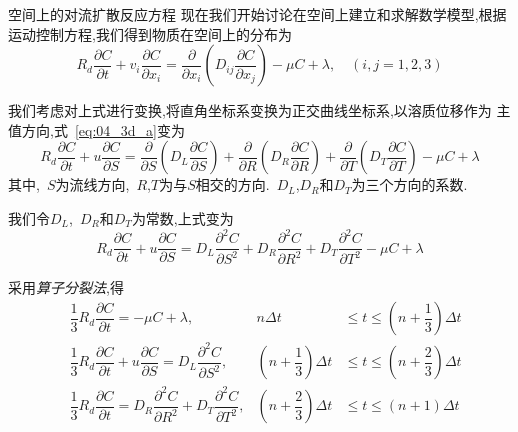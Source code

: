 \documentclass[xcolor=svgnames]{beamer} %
\begin{document}
\begin{frame}{空间上的对流扩散反应方程}
 现在我们开始讨论在空间上建立和求解数学模型,根据运动控制方程,我们得到物质在空间上的分布为
\begin{equation}\label{eq:04_3d_a}
R_d\dfrac{\partial C}{\partial t}+v_i\dfrac{\partial C}{\partial x_i}=\dfrac{\partial}{\partial x_i}(D_{ij}\dfrac{\partial C}
{\partial x_j})-\mu C+\lambda,\quad (i,j=1,2,3)
\end{equation}\par
\end{frame}
\begin{frame}
我们考虑对上式进行变换,将直角坐标系变换为正交曲线坐标系,以溶质位移作为
主值方向,式~\eqref{eq:04_3d_a}变为
\begin{equation}
R_d\dfrac{\partial C}{\partial t}+u\dfrac{\partial C}
{\partial S}=\dfrac{\partial}{\partial S}(D_L\dfrac{\partial C}{\partial S})
+\dfrac{\partial}{\partial R}(D_R\dfrac{\partial C}{\partial R})
+\dfrac{\partial}{\partial T}(D_T\dfrac{\partial C}{\partial T})-\mu C+\lambda
\end{equation}
其中,~$S$为流线方向,~$R$,$T$为与$S$相交的方向.~$D_L$,$D_R$和$D_T$为三个方向的系数.\par
我们令$D_L$,~$D_R$和$D_T$为常数,上式变为
\begin{equation}
R_d\dfrac{\partial C}{\partial t}+u\dfrac{\partial C}
{\partial S}=D_L\dfrac{\partial^2 C}{\partial S^2}+D_R\dfrac{\partial^2 C}{\partial R^2}+
D_T\dfrac{\partial^2 C}{\partial T^2}-\mu C+\lambda
\end{equation}
\end{frame}
\begin{frame}
采用\emph{算子分裂法},得
\begin{align}
&\dfrac{1}{3}R_d\dfrac{\partial C}{\partial t}=-\mu C+\lambda , & n\Delta t&\leq t\leq(n+\dfrac{1}{3})\Delta t \label{eq:04_3d_p1}\\
&\dfrac{1}{3}R_d\dfrac{\partial C}{\partial t}+ u\dfrac{\partial C}{\partial S}=D_L\dfrac{\partial^2 C}{\partial S^2}, & (n+\dfrac{1}{3})\Delta t&\leq t\leq (n+\dfrac{2}{3})\Delta t \label{eq:04_3d_p2}\\
&\dfrac{1}{3}R_d\dfrac{\partial C}{\partial t}=D_R\dfrac{\partial^2 C}{\partial R^2}+D_T\dfrac{\partial^2 C}{\partial T^2},& (n+\dfrac{2}{3})\Delta t&\leq t\leq(n+1)\Delta t \label{eq:04_3d_p3}
\end{align}
\end{frame}
\end{document}
